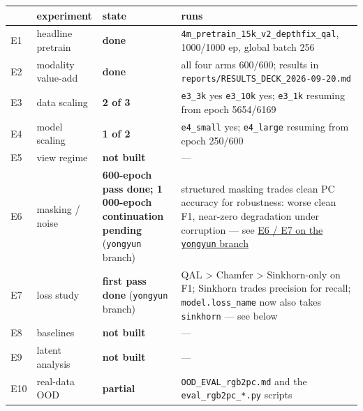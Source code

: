 \documentclass[
  10pt,
]{article}
\newcounter{none} %
\begin{document}
{\def\LTcaptype{none} %
\begin{longtable}[]{@{}
  >{\raggedright\arraybackslash}p{}
  >{\raggedright\arraybackslash}p{}
  >{\raggedright\arraybackslash}p{}
  >{\raggedright\arraybackslash}p{}@{}}
\toprule\noalign{}
\begin{minipage}[b]{\linewidth}\raggedright
\end{minipage} & \begin{minipage}[b]{\linewidth}\raggedright
experiment
\end{minipage} & \begin{minipage}[b]{\linewidth}\raggedright
state
\end{minipage} & \begin{minipage}[b]{\linewidth}\raggedright
runs
\end{minipage} \\
\midrule\noalign{}
\endhead
\bottomrule\noalign{}
\endlastfoot
E1 & headline pretrain & \textbf{done} &
\texttt{4m\_pretrain\_15k\_v2\_depthfix\_qal}, 1000/1000 ep, global
batch 256 \\
E2 & modality value-add & \textbf{done} & all four arms 600/600; results
in \texttt{reports/RESULTS\_DECK\_2026-09-20.md} \\
E3 & data scaling & \textbf{2 of 3} & \texttt{e3\_3k} yes
\texttt{e3\_10k} yes; \texttt{e3\_1k} resuming from epoch 5654/6169 \\
E4 & model scaling & \textbf{1 of 2} & \texttt{e4\_small} yes;
\texttt{e4\_large} resuming from epoch 250/600 \\
E5 & view regime & \textbf{not built} & --- \\
E6 & masking / noise & \textbf{600-epoch pass done; 1 000-epoch
continuation pending} (\texttt{yongyun} branch) & structured masking
trades clean PC accuracy for robustness: worse clean F1, near-zero
degradation under corruption --- see
\hyperref[e6--e7-on-the-yongyun-branch]{E6 / E7 on the \texttt{yongyun}
branch} \\
E7 & loss study & \textbf{first pass done} (\texttt{yongyun} branch) &
QAL \textgreater{} Chamfer \textgreater{} Sinkhorn-only on F1; Sinkhorn
trades precision for recall; \texttt{model.loss\_name} now also takes
\texttt{sinkhorn} --- see below \\
E8 & baselines & \textbf{not built} & --- \\
E9 & latent analysis & \textbf{not built} & --- \\
E10 & real-data OOD & \textbf{partial} & \texttt{OOD\_EVAL\_rgb2pc.md}
and the \texttt{eval\_rgb2pc\_*.py} scripts \\
\end{longtable}
}
\end{document}
